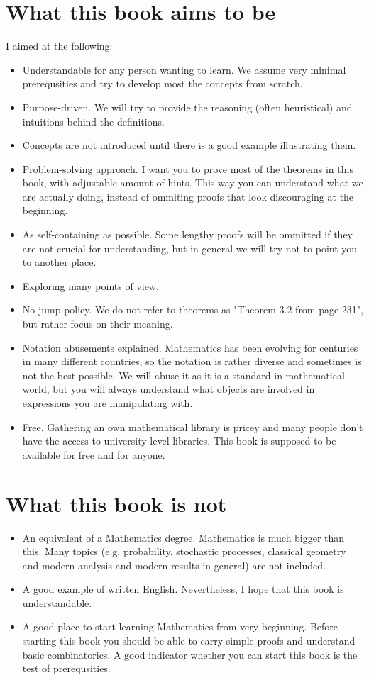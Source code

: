 \section{What this book aims to be}
I aimed at the following:
\begin{itemize}
  \item Understandable for any person wanting to learn. We assume very minimal prerequsities and try to develop most the concepts from scratch.
  \item Purpose-driven. We will try to provide the reasoning (often heuristical) and intuitions behind the definitions.
  \item Concepts are not introduced until there is a good example illustrating them.
  \item Problem-solving approach. I want you to prove most of the theorems in this book, with adjustable amount of hints. This way you can understand what we are actually doing, instead of ommiting proofs that look discouraging at the beginning.
  \item As self-containing as possible. Some lengthy proofs will be ommitted if they are not crucial for understanding, but in general we will try not to point you to another place.
  \item Exploring many points of view.
  \item No-jump policy. We do not refer to theorems as "Theorem 3.2 from page 231", but rather focus on their meaning.
  \item Notation abusements explained. Mathematics has been evolving for centuries in many different countries, so the notation
    is rather diverse and sometimes is not the best possible. We will abuse it as it is a standard in mathematical world, but you will always understand
    what objects are involved in expressions you are manipulating with.
  \item Free. Gathering an own mathematical library is pricey and many people don't have the access to university-level libraries. This book is supposed to be available for free and for anyone.
\end{itemize}

\section{What this book is not}
\begin{itemize}
  \item An equivalent of a Mathematics degree. Mathematics is much bigger than this. Many topics (e.g. probability, stochastic processes, classical geometry and modern analysis and modern results in general) are not included.
  \item A good example of written English. Nevertheless, I hope that this book is understandable.
  \item A good place to start learning Mathematics from very beginning. Before starting this book you should be able to carry simple proofs and understand basic combinatorics. A good indicator whether you can start this book is the test of prerequsities.
\end{itemize}

